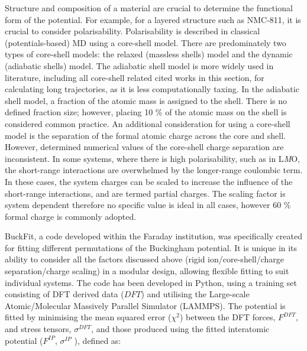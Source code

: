 \documentclass[../main.tex]{subfiles}
\begin{document}
Structure and composition of a material are crucial to determine the functional form of the potential. For example, for a layered structure such as NMC-811, it is crucial to consider polarisability. Polarisability is described in classical (potentials-based) MD using a core-shell model. There are predominately two types of core-shell models: the relaxed (massless shells) model \cite{Lindan_1993} and the dynamic (adiabatic shells) model.\cite{Mitchell_1993} The adiabatic shell model is more widely used in literature, including all core-shell related cited works in this section,\cite{Hart1998, Fisher2010, Lewis_1985,Ammundsen1999, Kerisit2014, he2019thermal,lee2012atomistic} for calculating long trajectories, as it is less computationally taxing. In the adiabatic shell model, a fraction of the atomic mass is assigned to the shell. There is no defined fraction size; however, placing 10 \% of the atomic mass on the shell is considered common practice. \cite{PLIMPTON19951,todorov2006dl_poly_3} An additional consideration for using a core-shell model is the separation of the formal atomic charge across the core and shell. However, determined numerical values of the core-shell charge separation are inconsistent.\cite{wang2014molecular,escribano2017enhancing, lee2012atomistic,Lee2013_lithium,dai2019comparison} In some systems, where there is high polarisability, such as in L\textit{M}O, the short-range interactions are overwhelmed by the longer-range coulombic term. In these cases, the system charges can be scaled to increase the influence of the short-range interactions, and are termed partial charges. The scaling factor is system dependent therefore no specific value is ideal in all cases, however 60 \% formal charge is commonly adopted. \cite{pedone2006potentials}

BuckFit, \cite{Morgan2020BuckFit} a code developed within the Faraday institution, was specifically created for fitting different permutations of the Buckingham potential. It is unique in its ability to consider all the factors discussed above (rigid ion/core-shell/charge separation/charge scaling) in a modular design, allowing flexible fitting to suit individual systems. The code has been developed in Python, using a training set consisting of DFT derived data ($DFT$) and utilising the Large-scale Atomic/Molecular Massively Parallel Simulator (LAMMPS).\cite{PLIMPTON19951} The potential is fitted by minimising the mean squared error ($\chi^2$) between the DFT forces, $F^{DFT}$, and stress tensors, $\sigma^{DFT}$, and those produced using the fitted interatomic potential ($F^{IP}$, $\sigma^{IP}$ ), defined as:
\end{document}
